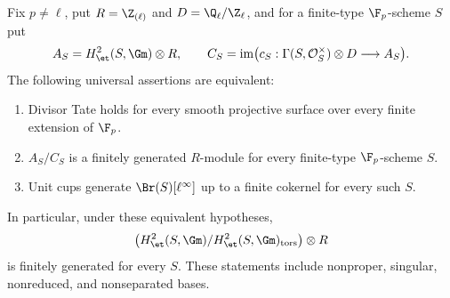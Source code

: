 \begin{theorem}
\label{thm:B-all-bases-Brauer-units}
Fix \(p\ne\ell\), put \(R=\Z_{(\ell)}\) and
\(D=\Q_\ell/\Z_\ell\), and for a finite-type
\(\F_p\)-scheme \(S\) put
\[
 A_S=H^2_{\et}(S,\Gm)\otimes R,
 \qquad C_S=\operatorname{im}
       \bigl(c_S:\Gamma(S,\mathcal O_S^\times)\otimes D
                         \longrightarrow A_S\bigr).
\]
The following universal assertions are equivalent:
\begin{enumerate}[label=(\roman*)]
\item Divisor Tate holds for every smooth projective surface
      over every finite extension of \(\F_p\).
\item \(A_S/C_S\) is a finitely generated \(R\)-module
      for every finite-type \(\F_p\)-scheme \(S\).
\item Unit cups generate \(\Br(S)[\ell^\infty]\) up
      to a finite cokernel for every such \(S\).
\end{enumerate}
In particular, under these equivalent hypotheses,
\[
 \bigl(H^2_{\et}(S,\Gm)/H^2_{\et}(S,\Gm)_{\rm tors}\bigr)
                  \otimes R
\]
is finitely generated for every \(S\).  These statements
include nonproper, singular, nonreduced, and nonseparated bases.
\end{theorem}
